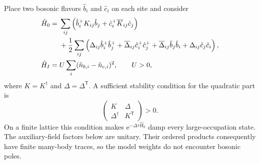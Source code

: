 \documentclass[onecolumn,aps,prb,amsmath,amssymb,superscriptaddress,longbibliography]{revtex4-2}
\newcommand{\ee}{\mathrm{e}}
\newcommand{\trans}{\mathsf{T}}
\begin{document}
Place two bosonic flavors \(\hat b_i\) and \(\hat c_i\) on each site and consider
\begin{align}
    \hat H_0={}&
    \sum_{ij}\left(
      \hat b_i^+K_{ij}\hat b_j
      +\hat c_i^+\overline{K}_{ij}\hat c_j
    \right)
    \notag\\
    &+\frac12\sum_{ij}\left(
      \Delta_{ij}\hat b_i^+\hat b_j^+
      +\overline\Delta_{ij}\hat c_i^+\hat c_j^+
      +\overline\Delta_{ij}\hat b_j\hat b_i
      +\Delta_{ij}\hat c_j\hat c_i
    \right),
    \label{eq:conjugate_BdG_H0}\\
    \hat H_I={}&U\sum_i(\hat n_{b,i}-\hat n_{c,i})^2,
    \qquad U>0,
    \label{eq:conjugate_BdG_HI}
\end{align}
where \(K=K^\dagger\) and \(\Delta=\Delta^\trans\).  A sufficient stability condition for the quadratic part is
\begin{equation}
    \begin{pmatrix}K&\Delta\\ \Delta^\dagger&K^\trans\end{pmatrix}>0.
    \label{eq:conjugate_BdG_stability}
\end{equation}
On a finite lattice this condition makes \(\ee^{-\Delta\tau\hat H_0}\) damp every large-occupation state.  The auxiliary-field factors below are unitary.  Their ordered products consequently have finite many-body traces, so the model weights do not encounter bosonic poles.
\end{document}

